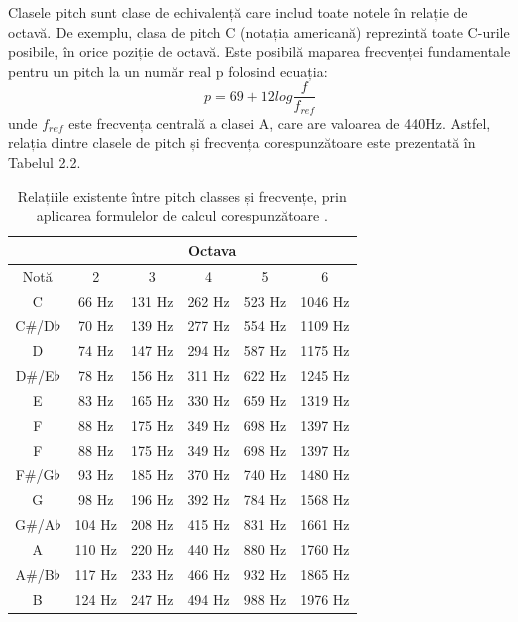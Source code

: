 \documentclass[a4paper,12pt]{report}
\begin{document}
Clasele pitch sunt clase de echivalență care includ toate notele 
în relație de octavă. De exemplu, clasa de pitch C (notația americană)
reprezintă toate C-urile posibile, în orice poziție de octavă.
Este posibilă maparea frecvenței fundamentale pentru un pitch
la un număr real p folosind ecuația:
\begin{equation*}
    p = 69 + 12log\frac{f}{f_{ref}}
\end{equation*}
unde $f_{ref}$ este frecvența centrală a clasei A, care are valoarea de 
440Hz. Astfel, relația dintre clasele 
de pitch și frecvența corespunzătoare este prezentată în Tabelul 2.2.

\begin{table}[h!]
    \begin{center}
        \begin{tabular}{ | c | c | c | c | c | c |}
            \hline 
                  & \multicolumn{5}{|c|}{Octava} \\
                \hline 
                Notă & 2 & 3 & 4 & 5 & 6 \\   
                \hline \hline
                C & 66 Hz & 131 Hz & 262 Hz & 523 Hz & 1046 Hz \\ 
                \hline 
                C\#/D$\flat$ & 70 Hz & 139 Hz & 277 Hz & 554 Hz & 1109 Hz \\ 
                \hline
                D & 74 Hz & 147 Hz & 294 Hz & 587 Hz & 1175 Hz \\ 
                \hline
                D\#/E$\flat$ & 78 Hz & 156 Hz & 311 Hz & 622 Hz & 1245 Hz \\ 
                \hline
                E & 83 Hz & 165 Hz & 330 Hz & 659 Hz & 1319 Hz \\ 
                \hline
                F & 88 Hz & 175 Hz & 349 Hz & 698 Hz & 1397 Hz \\ 
                \hline
                F & 88 Hz & 175 Hz & 349 Hz & 698 Hz & 1397 Hz \\ 
                \hline
                F\#/G$\flat$ & 93 Hz & 185 Hz & 370 Hz & 740 Hz & 1480 Hz \\ 
                \hline
                G & 98 Hz & 196 Hz & 392 Hz & 784 Hz & 1568 Hz \\ 
                \hline
                G\#/A$\flat$ & 104 Hz & 208 Hz & 415 Hz & 831 Hz & 1661 Hz \\ 
                \hline
                A & 110 Hz & 220 Hz & 440 Hz & 880 Hz & 1760 Hz \\ 
                \hline
                A\#/B$\flat$ & 117 Hz & 233 Hz & 466 Hz & 932 Hz & 1865 Hz \\ 
                \hline
                B & 124 Hz & 247 Hz & 494 Hz & 988 Hz & 1976 Hz \\ 
                \hline
        \end{tabular}
        \caption{Relațiile existente între pitch classes și frecvențe, prin 
        aplicarea formulelor de calcul corespunzătoare \cite{Bonvini-Recognition}.}
    \end{center}
\end{table}
\end{document}
